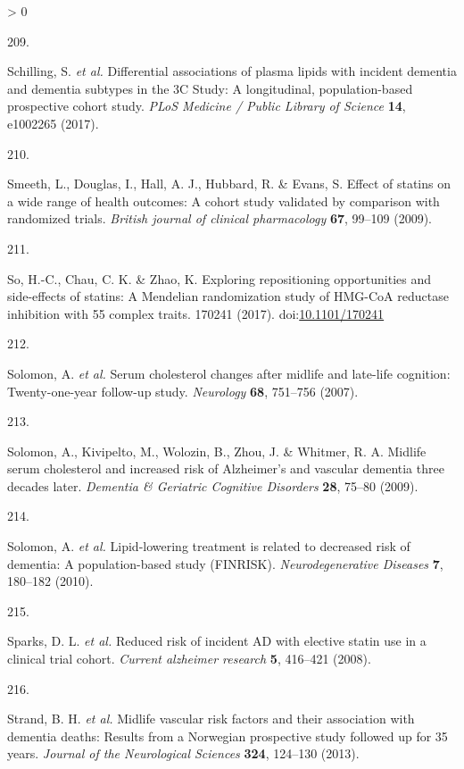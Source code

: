 \documentclass[a4paper, twoside]{templates/ociamthesis}
\newlength{\cslhangindent}
\newlength{\csllabelwidth}
\newenvironment{CSLReferences}[3] %
 {%
  \setlength{\parindent}{0pt}
  \ifodd #1 \everypar{\setlength{\hangindent}{\cslhangindent}}\ignorespaces\fi
  \ifnum #2 > 0
  \setlength{\parskip}{#2\baselineskip}
  \fi
 }%
 {}
\newcommand{\CSLLeftMargin}[1]{\parbox[t]{\maxof{\widthof{#1}}{\csllabelwidth}}{#1}}
\newcommand{\CSLRightInline}[1]{\parbox[t]{\linewidth - \csllabelwidth}{#1}}
\begin{document}
\begin{CSLReferences}{0}{0}
\leavevmode\hypertarget{ref-schilling2017a}{}%
\CSLLeftMargin{209. }
\CSLRightInline{Schilling, S. \emph{et al.} Differential associations of plasma lipids with incident dementia and dementia subtypes in the {3C Study}: {A} longitudinal, population-based prospective cohort study. \emph{PLoS Medicine / Public Library of Science} \textbf{14}, e1002265 (2017).}

\leavevmode\hypertarget{ref-smeeth2009a}{}%
\CSLLeftMargin{210. }
\CSLRightInline{Smeeth, L., Douglas, I., Hall, A. J., Hubbard, R. \& Evans, S. Effect of statins on a wide range of health outcomes: A cohort study validated by comparison with randomized trials. \emph{British journal of clinical pharmacology} \textbf{67}, 99--109 (2009).}

\leavevmode\hypertarget{ref-so2017}{}%
\CSLLeftMargin{211. }
\CSLRightInline{So, H.-C., Chau, C. K. \& Zhao, K. Exploring repositioning opportunities and side-effects of statins: A {Mendelian} randomization study of {HMG}-{CoA} reductase inhibition with 55 complex traits. 170241 (2017). doi:\href{https://doi.org/10.1101/170241}{10.1101/170241}}

\leavevmode\hypertarget{ref-solomon2007}{}%
\CSLLeftMargin{212. }
\CSLRightInline{Solomon, A. \emph{et al.} Serum cholesterol changes after midlife and late-life cognition: Twenty-one-year follow-up study. \emph{Neurology} \textbf{68}, 751--756 (2007).}

\leavevmode\hypertarget{ref-solomon2009a}{}%
\CSLLeftMargin{213. }
\CSLRightInline{Solomon, A., Kivipelto, M., Wolozin, B., Zhou, J. \& Whitmer, R. A. Midlife serum cholesterol and increased risk of {Alzheimer}'s and vascular dementia three decades later. \emph{Dementia \& Geriatric Cognitive Disorders} \textbf{28}, 75--80 (2009).}

\leavevmode\hypertarget{ref-solomon2010}{}%
\CSLLeftMargin{214. }
\CSLRightInline{Solomon, A. \emph{et al.} Lipid-lowering treatment is related to decreased risk of dementia: A population-based study ({FINRISK}). \emph{Neurodegenerative Diseases} \textbf{7}, 180--182 (2010).}

\leavevmode\hypertarget{ref-sparks2008}{}%
\CSLLeftMargin{215. }
\CSLRightInline{Sparks, D. L. \emph{et al.} Reduced risk of incident {AD} with elective statin use in a clinical trial cohort. \emph{Current alzheimer research} \textbf{5}, 416--421 (2008).}

\leavevmode\hypertarget{ref-strand2013}{}%
\CSLLeftMargin{216. }
\CSLRightInline{Strand, B. H. \emph{et al.} Midlife vascular risk factors and their association with dementia deaths: Results from a {Norwegian} prospective study followed up for 35 years. \emph{Journal of the Neurological Sciences} \textbf{324}, 124--130 (2013).}


\end{CSLReferences}
\end{document}
